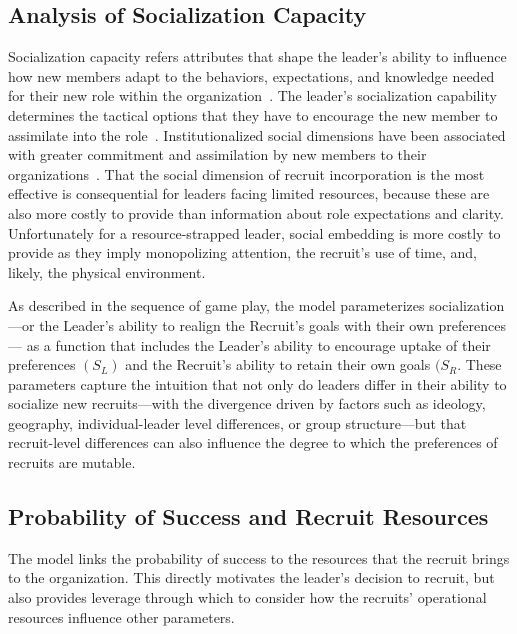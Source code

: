 \subsection{Analysis of Socialization Capacity}
 
 Socialization capacity refers attributes that shape the leader's ability to influence how new members adapt to the behaviors, expectations, and knowledge needed for their new role within the organization~\autocite{allen2006organizational}. The leader's socialization capability determines the tactical options that they have to encourage the new member to assimilate into the role~\autocite{berkelaar2019orgsoc, van1977toward}. Institutionalized social dimensions have been associated with greater commitment and assimilation by new members to their organizations~\autocite{bauer2012organizational}. That the social dimension of recruit incorporation is the most effective is consequential for leaders facing limited resources, because these are also more costly to provide than information about role expectations and clarity. Unfortunately for a resource-strapped leader, social embedding is more costly to provide as they imply monopolizing attention, the recruit's use of time, and, likely, the physical environment.

 As described in the sequence of game play, the model parameterizes socialization---or the Leader's ability to realign the Recruit's goals with their own preferences--- as a function that includes the Leader's ability to encourage uptake of their preferences $(S_{L})$ and the Recruit's ability to retain their own goals $(S_{R}$.   These parameters capture the intuition that not only do leaders differ in their ability to socialize new recruits---with the divergence driven by factors such as ideology, geography, individual-leader level differences, or group structure---but that recruit-level differences can also influence the degree to which the preferences of recruits are mutable. 


\subsection{Probability of Success and Recruit Resources}

The model links the probability of success to the resources that the recruit brings to the organization. This directly motivates the leader's decision to recruit, but also provides leverage through which to consider how the recruits' operational resources influence other parameters.  

